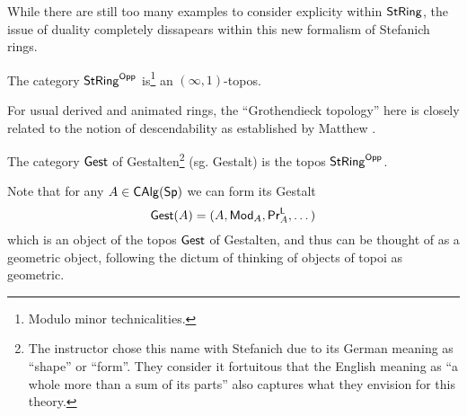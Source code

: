 While there are still too many examples to consider explicity within $\mathsf{St}\mathsf{Ring}$, the issue of duality completely dissapears within this new formalism of Stefanich rings. 
\begin{theorem}\label{thm: Gest is topos}
    The category $\mathsf{St}\mathsf{Ring}^{\mathsf{Opp}}$ is\footnote{Modulo minor technicalities.} an $(\infty,1)$-topos. 
\end{theorem}
\begin{remark}
    For usual derived and animated rings, the ``Grothendieck topology'' here is closely related to the notion of descendability as established by Matthew \cite{MatthewDescendability}. 
\end{remark}
\begin{definition}[Gestalten]\label{def: Gestalten}
    The category $\mathsf{Gest}$ of Gestalten\footnote{The instructor chose this name with Stefanich due to its German meaning as ``shape'' or ``form''. They consider it fortuitous that the English meaning as ``a whole more than a sum of its parts'' also captures what they envision for this theory.} (sg. Gestalt) is the topos $\mathsf{St}\mathsf{Ring}^{\mathsf{Opp}}$. 
\end{definition}
Note that for any $A\in\mathsf{CAlg}(\mathsf{Sp})$ we can form its Gestalt $$\mathsf{Gest}(A)=(A,\mathsf{Mod}_{A},\mathsf{Pr}^{\mathsf{L}}_{A},\dots)$$ which is an object of the topos $\mathsf{Gest}$ of Gestalten, and thus can be thought of as a geometric object, following the dictum of thinking of objects of topoi as geometric.  

